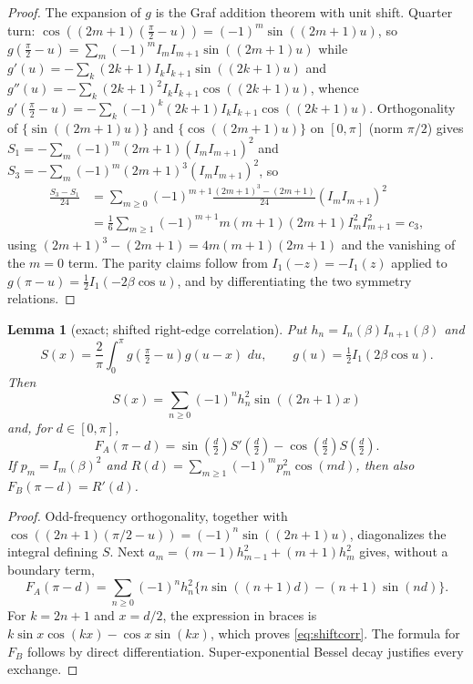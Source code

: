 \documentclass[11pt]{article}
\newtheorem{lemma}[theorem]{Lemma}
\theoremstyle{remark}
\newcommand{\FA}{F_{\!A}}
\newcommand{\FB}{F_{\!B}}
\newcommand{\dd}{\,d}
\begin{document}
\begin{proof}
The expansion of $g$ is the Graf addition theorem with unit shift.
Quarter turn: $\cos((2m+1)(\tfrac\pi2-u))=(-1)^m\sin((2m+1)u)$, so
$g(\tfrac\pi2-u)=\sum_m(-1)^mI_mI_{m+1}\sin((2m+1)u)$ while
$g'(u)=-\sum_k(2k+1)I_kI_{k+1}\sin((2k+1)u)$ and
$g''(u)=-\sum_k(2k+1)^2I_kI_{k+1}\cos((2k+1)u)$, whence
$g'(\tfrac\pi2-u)=-\sum_k(-1)^k(2k+1)I_kI_{k+1}\cos((2k+1)u)$.
Orthogonality of $\{\sin((2m+1)u)\}$ and $\{\cos((2m+1)u)\}$ on
$[0,\pi]$ (norm $\pi/2$) gives
$S_1=-\sum_m(-1)^m(2m+1)(I_mI_{m+1})^2$ and
$S_3=-\sum_m(-1)^m(2m+1)^3(I_mI_{m+1})^2$, so
\begin{align*}
\frac{S_3-S_1}{24}
&=\sum_{m\ge0}(-1)^{m+1}\frac{(2m+1)^3-(2m+1)}{24}(I_mI_{m+1})^2\\
&=\frac16\sum_{m\ge1}(-1)^{m+1}m(m+1)(2m+1)I_m^2I_{m+1}^2=c_3,
\end{align*}
using $(2m+1)^3-(2m+1)=4m(m+1)(2m+1)$ and the vanishing of the $m=0$
term. The parity claims follow from $I_1(-z)=-I_1(z)$ applied to
$g(\pi-u)=\tfrac12I_1(-2\beta\cos u)$, and by differentiating the two
symmetry relations.
\end{proof}

\begin{lemma}[exact; shifted right-edge correlation]\label{lem:shiftcorr}
Put $h_n=I_n(\beta)I_{n+1}(\beta)$ and
\[
 S(x)=\frac2\pi\int_0^\pi g(\tfrac\pi2-u)g(u-x)\,\dd u,
 \qquad g(u)=\tfrac12 I_1(2\beta\cos u).
\]
Then
\[
 S(x)=\sum_{n\ge0}(-1)^nh_n^2\sin((2n+1)x)
\]
and, for $d\in[0,\pi]$,
\begin{equation}\label{eq:shiftcorr}
 \FA(\pi-d)=\sin(\tfrac d2)S'(\tfrac d2)
              -\cos(\tfrac d2)S(\tfrac d2).
\end{equation}
If $p_m=I_m(\beta)^2$ and
$R(d)=\sum_{m\ge1}(-1)^mp_m^2\cos(md)$, then also
$\FB(\pi-d)=R'(d)$.
\end{lemma}

\begin{proof}
Odd-frequency orthogonality, together with
$\cos((2n+1)(\pi/2-u))=(-1)^n\sin((2n+1)u)$, diagonalizes the
integral defining $S$.  Next
$a_m=(m-1)h_{m-1}^2+(m+1)h_m^2$ gives, without a boundary term,
\[
 \FA(\pi-d)=\sum_{n\ge0}(-1)^nh_n^2
 \{n\sin((n+1)d)-(n+1)\sin(nd)\}.
\]
For $k=2n+1$ and $x=d/2$, the expression in braces is
$k\sin x\cos(kx)-\cos x\sin(kx)$, which proves
\eqref{eq:shiftcorr}.  The formula for $\FB$ follows by direct
differentiation.  Super-exponential Bessel decay justifies every exchange.
\end{proof}
\end{document}
